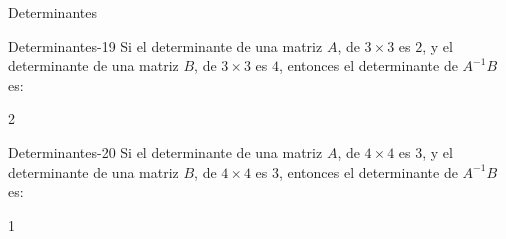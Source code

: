 \documentclass[a4,11pt]{aleph-notas}
\begin{document}
\begin{quiz}{Determinantes}
\begin{numerical}[tolerance=0.01]%
    {Determinantes-19}
    Si el determinante de una matriz $A$, de $3\times 3$ es $2$, y el determinante de una matriz $B$, de $3\times 3$ es $4$, entonces el determinante de $A^{-1}B$ es:
    \item 2
\end{numerical}

\begin{numerical}[tolerance=0.01]%
    {Determinantes-20}
    Si el determinante de una matriz $A$, de $4\times 4$ es $3$, y el determinante de una matriz $B$, de $4\times 4$ es $3$, entonces el determinante de $A^{-1}B$ es:
    \item 1
\end{numerical}

\end{quiz}
\end{document}
